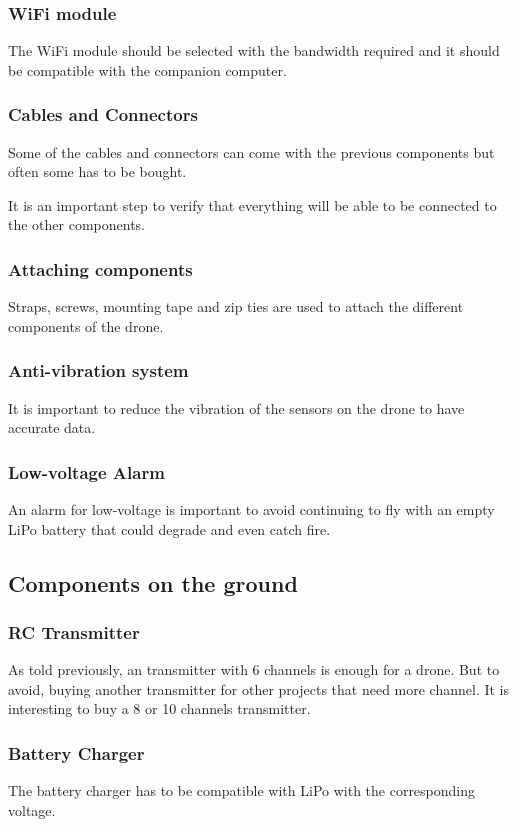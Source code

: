 \subsubsection{WiFi module}
The WiFi module should be selected with the bandwidth required and it should be compatible with the companion computer.

\subsubsection{Cables and Connectors}
Some of the cables and connectors can come with the previous components but often some has to be bought.

It is an important step to verify that everything will be able to be connected to the other components.

\subsubsection{Attaching components}
Straps, screws, mounting tape and zip ties are used to attach the different components of the drone.

\subsubsection{Anti-vibration system}
It is important to reduce the vibration of the sensors on the drone to have accurate data.

\subsubsection{Low-voltage Alarm}
An alarm for low-voltage is important to avoid continuing to fly with an empty LiPo battery that could degrade and even catch fire.

\subsection{Components on the ground}

\subsubsection{RC Transmitter}
As told previously, an transmitter with 6 channels is enough for a drone. But to avoid, buying another transmitter for other projects that need more channel. It is interesting to buy a 8 or 10 channels transmitter.

\subsubsection{Battery Charger}
The battery charger has to be compatible with LiPo with the corresponding voltage.


